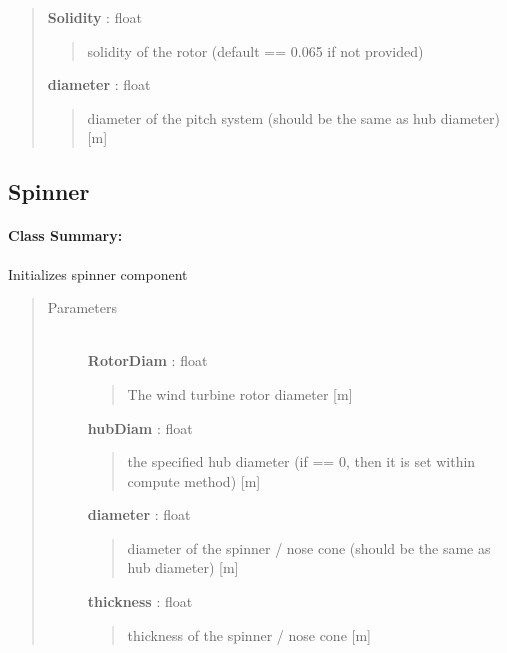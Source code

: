 \documentclass[letterpaper,10pt,openany,oneside]{sphinxmanual}
\begin{document}
\begin{fulllineitems}
\begin{quote}
\begin{description}
\textbf{Solidity} : float
\begin{quote}

solidity of the rotor (default == 0.065 if not provided)
\end{quote}

\textbf{diameter} : float
\begin{quote}

diameter of the pitch system (should be the same as hub diameter) {[}m{]}
\end{quote}

\end{description}\end{quote}

\end{fulllineitems}



\subsection{Spinner}
\label{documentation:spinner}\label{documentation:spinner-class-label}\paragraph{Class Summary:}

\begin{fulllineitems}
\label{documentation:nacelleSE.src.hub_components.Spinner}
Initializes spinner component
\begin{quote}\begin{description}
\item[{Parameters }] \leavevmode\\
\textbf{RotorDiam} : float
\begin{quote}

The wind turbine rotor diameter {[}m{]}
\end{quote}

\textbf{hubDiam} : float
\begin{quote}

the specified hub diameter (if == 0, then it is set within compute method) {[}m{]}
\end{quote}

\textbf{diameter} : float
\begin{quote}

diameter of the spinner / nose cone (should be the same as hub diameter) {[}m{]}
\end{quote}

\textbf{thickness} : float
\begin{quote}

thickness of the spinner / nose cone {[}m{]}
\end{quote}

\end{description}\end{quote}

\end{fulllineitems}
\end{document}
